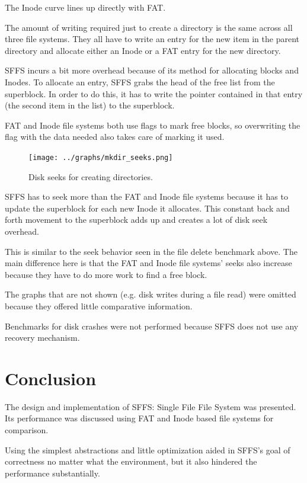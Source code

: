 \documentclass[10pt,twocolumn]{article}
\begin{document}
  The Inode curve lines up directly with FAT.

  The amount of writing required just to create a directory is the same across 
  all three file systems. They all have to write an entry for the new item in  
  the parent directory and allocate either an Inode or a FAT entry for the new 
  directory.
	
  SFFS incurs a bit more overhead because of its method for allocating blocks
  and Inodes. To allocate an entry, SFFS grabs the head of the free list from
  the superblock. In order to do this, it has to write the pointer contained
  in that entry (the second item in the list) to the superblock. 

  FAT and Inode file systems both use flags to mark free blocks, so overwriting 
  the flag with the data needed also takes care of marking it used.

  \begin{figure}[h]
    \begin{center}
      \texttt{[image: ../graphs/mkdir\_seeks.png]}
      \label{fig:delete_seeks}
      \caption{Disk seeks for creating directories.}
    \end{center}
  \end{figure}

  SFFS has to seek more than the FAT and Inode file systems because it has to
  update the superblock for each new Inode it allocates. This constant back
  and forth movement to the superblock adds up and creates a lot of disk seek
  overhead.

  This is similar to the seek behavior seen in the file delete benchmark above. 
  The main difference here is that the FAT and Inode file systems' seeks also 
  increase because they have to do more work to find a free block.

\bigskip\bigskip\bigskip
The graphs that are not shown (e.g. disk writes during a file read) were 
omitted because they offered little comparative information. 

Benchmarks for disk crashes were not performed because SFFS does not use any
recovery mechanism.

\section{Conclusion}
The design and implementation of SFFS: Single File File System was presented.
Its performance was discussed using FAT and Inode based file systems for 
comparison.

Using the simplest abstractions and little optimization aided in SFFS's goal of 
correctness no matter what the environment, but it also hindered the 
performance substantially.
\end{document}
